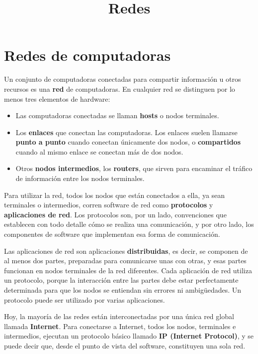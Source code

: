\documentclass[spanish,a4paper,]{article}
\title{Redes}
\date{}
\providecommand{\tightlist}{%
  \setlength{\itemsep}{0pt}\setlength{\parskip}{0pt}}
\begin{document}
\maketitle

\hypertarget{redes-de-computadoras}{%
\section{Redes de computadoras}\label{redes-de-computadoras}}

Un conjunto de computadoras conectadas para compartir información u
otros recursos es una \textbf{red} de computadoras. En cualquier red se
distinguen por lo menos tres elementos de hardware:

\begin{itemize}
\tightlist
\item
  Las computadoras conectadas se llaman \textbf{hosts} o nodos
  terminales.
\item
  Los \textbf{enlaces} que conectan las computadoras. Los enlaces suelen
  llamarse \textbf{punto a punto} cuando conectan únicamente dos nodos,
  o \textbf{compartidos} cuando al mismo enlace se conectan más de dos
  nodos.
\item
  Otros \textbf{nodos intermedios}, los \textbf{routers}, que sirven
  para encaminar el tráfico de información entre los nodos terminales.
\end{itemize}

Para utilizar la red, todos los nodos que están conectados a ella, ya
sean terminales o intermedios, corren software de red como
\textbf{protocolos} y \textbf{aplicaciones de red}. Los protocolos son,
por un lado, convenciones que establecen con todo detalle cómo se
realiza una comunicación, y por otro lado, los componentes de software
que implementan esa forma de comunicación.

Las aplicaciones de red son aplicaciones \textbf{distribuidas}, es
decir, se componen de al menos dos partes, preparadas para comunicarse
unas con otras, y esas partes funcionan en nodos terminales de la red
diferentes. Cada aplicación de red utiliza un protocolo, porque la
interacción entre las partes debe estar perfectamente determinada para
que los nodos se entiendan sin errores ni ambigüedades. Un protocolo
puede ser utilizado por varias aplicaciones.

Hoy, la mayoría de las redes están interconectadas por una única red
global llamada \textbf{Internet}. Para conectarse a Internet, todos los
nodos, terminales e intermedios, ejecutan un protocolo básico llamado
\textbf{IP (Internet Protocol)}, y se puede decir que, desde el punto de
vista del software, constituyen una sola red.
\end{document}
